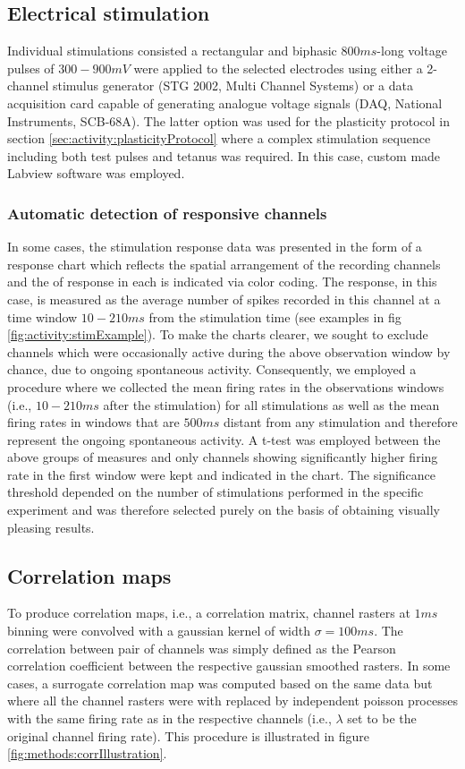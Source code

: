 \subsection{Electrical stimulation}
Individual stimulations consisted a rectangular and biphasic \(800 ms\)-long voltage pulses of \(300-900 mV\) were applied to the selected electrodes using either a 2-channel stimulus generator (STG 2002, Multi Channel Systems) or a data acquisition card capable of generating analogue voltage signals (DAQ, National Instruments, SCB-68A). The latter option was used for the plasticity protocol in section \ref{sec:activity:plasticityProtocol} where a complex stimulation sequence including both test pulses and tetanus was required. In this case, custom made Labview software was employed.

\label{sec:methods:stim}


\subsubsection{Automatic detection of responsive channels}
In some cases, the stimulation response data was presented in the form of a response chart which reflects the spatial arrangement of the recording channels and the of response in each is indicated via color coding. The response, in this case, is measured as the average number of spikes recorded in this channel at a time window \(10-210ms\) from the stimulation time (see examples in fig \ref{fig:activity:stimExample}). To make the charts clearer, we sought to exclude channels which were occasionally active during the above observation window by chance, due to ongoing spontaneous activity. Consequently, we employed a procedure where we collected the mean firing rates in the observations windows (i.e., \(10-210ms\) after the stimulation) for all stimulations as well as the mean firing rates in windows that are \(500ms\) distant from any stimulation and therefore represent the ongoing spontaneous activity. A t-test was employed between the above groups of measures and only channels showing significantly higher firing rate in the first window were kept and indicated in the chart. The significance threshold depended on the number of stimulations performed in the specific experiment and was therefore selected purely on the basis of obtaining visually pleasing results.


\subsection{Correlation maps}
To produce correlation maps, i.e., a correlation matrix, channel rasters at \(1ms\) binning were convolved with a gaussian kernel of width \(\sigma=100ms\). The correlation between pair of channels was simply defined as the Pearson correlation coefficient between the respective gaussian smoothed rasters. In some cases, a surrogate correlation map was computed based on the same data but where all the channel rasters were with replaced by independent poisson processes with the same firing rate as in the respective channels (i.e., \(\lambda\) set to be the original channel firing rate). This procedure is illustrated in figure \ref{fig:methods:corrIllustration}.


